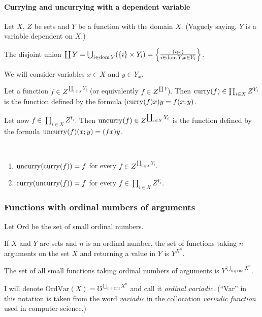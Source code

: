 \paragraph{Currying and uncurrying with a dependent variable}

Let $X$, $Z$ be sets and $Y$ be a function with the domain $X$.
(Vaguely saying, $Y$ is a variable dependent on $X$.)

The disjoint union $\coprod Y=\bigcup_{i\in\operatorname{dom} Y}(\{i\}\times Y_{i})=\left\{ \frac{(i;x)}{i\in\operatorname{dom} Y,x\in Y_{i}}\right\}$.

We will consider variables $x\in X$ and $y\in Y_{x}$.

Let a function $f\in Z^{\coprod_{i\in X}Y_{i}}$
(or equivalently $f\in Z^{\coprod Y}$). Then $\operatorname{curry}(f)\in\prod_{i\in X}Z^{Y_{i}}$
is the function defined by the formula $(\operatorname{curry}(f)x)y=f(x;y)$.

Let now $f\in\prod_{i\in X}Z^{Y_{i}}$. Then $\operatorname{uncurry}(f)\in Z^{\coprod_{i\in X}Y_{i}}$
is the function defined by the formula $\operatorname{uncurry}(f)(x;y)=(fx)y$.
\begin{obvious}
~
\begin{enumerate}
\item $\operatorname{uncurry}(\operatorname{curry}(f))=f$ for every $f\in Z^{\coprod_{i\in X}Y_{i}}$.
\item $\operatorname{curry}(\operatorname{uncurry}(f))=f$ for every $f\in\prod_{i\in X}Z^{Y_{i}}$.
\end{enumerate}
\end{obvious}

\subsubsection{Functions with ordinal numbers of arguments}

Let $\mathrm{Ord}$ be the set of small ordinal numbers.

If $X$ and $Y$ are sets and $n$ is an ordinal number, the set of
functions taking $n$ arguments on the set $X$ and returning a value
in $Y$ is $Y^{X^{n}}$.

The set of all small functions taking ordinal numbers of arguments
is $Y^{\bigcup_{n\in\mathrm{Ord}}X^{n}}$.

I will denote $\mathrm{OrdVar}(X)=\mho^{\bigcup_{n\in\mathrm{Ord}}X^{n}}$
and call it \emph{ordinal variadic}. (``Var'' in this notation is
taken from the word \emph{variadic} in the collocation \emph{variadic
function} used in computer science.)


